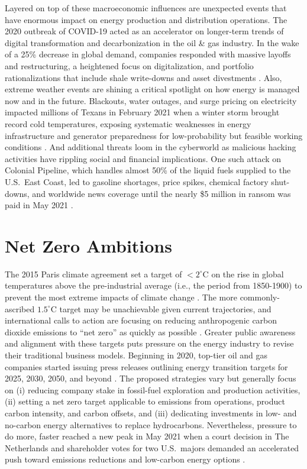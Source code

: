 Layered on top of these macroeconomic influences are unexpected events that have enormous impact on energy production and distribution operations. The 2020 outbreak of COVID-19 acted as an accelerator on longer-term trends of digital transformation and decarbonization in the oil \& gas industry. In the wake of a 25\% decrease in global demand, companies responded with massive layoffs and restructuring, a heightened focus on digitalization, and portfolio rationalizations that include shale write-downs and asset divestments \citep{deloitte_2021_2020}. Also, extreme weather events are shining a critical spotlight on how energy is managed now and in the future. Blackouts, water outages, and surge pricing on electricity impacted millions of Texans in February 2021 when a winter storm brought record cold temperatures, exposing systematic weaknesses in energy infrastructure and generator preparedness for low-probability but feasible working conditions \citep{harc_winter_2021,lazard_lazards_2020}. And additional threats loom in the cyberworld as malicious hacking activities have rippling social and financial implications. One such attack on Colonial Pipeline, which handles almost 50\% of the liquid fuels supplied to the U.S.\ East Coast, led to gasoline shortages, price spikes, chemical factory shut-downs, and worldwide news coverage until the nearly \$5 million in ransom was paid in May 2021 \citep{sanger_pipeline_2021}.

\section{Net Zero Ambitions}\label{ch1:netzero}
The 2015 Paris climate agreement set a target of $<2^\circ$C on the rise in global temperatures above the pre-industrial average (i.e., the period from 1850-1900) to prevent the most extreme impacts of climate change \citep{unfccc_paris_2015}. The more commonly-ascribed $1.5^\circ$C target may be unachievable given current trajectories, and international calls to action are focusing on reducing anthropogenic carbon dioxide emissions to ``net zero'' as quickly as possible \citep{ipcc_global_2018}. Greater public awareness and alignment with these targets puts pressure on the energy industry to revise their traditional business models. Beginning in 2020, top-tier oil and gas companies started issuing press releases outlining energy transition targets for 2025, 2030, 2050, and beyond \citep{bp_international_2020,chevron_chevron_2021,conocophillips_conocophillips_2020,equinor_equinor_2020,exxonmobil_exxonmobil_2021,shell_responsible_2020,shell_shell_2021,total_total_2020,total_2020_2021}. The proposed strategies vary but generally focus on (i) reducing company stake in fossil-fuel exploration and production activities, (ii) setting a net zero target applicable to emissions from operations, product carbon intensity, and carbon offsets, and (iii) dedicating investments in low- and no-carbon energy alternatives to replace hydrocarbons. Nevertheless, pressure to do more, faster reached a new peak in May 2021 when a court decision in The Netherlands and shareholder votes for two U.S.\ majors demanded an accelerated push toward emissions reductions and low-carbon energy options \citep{mcwilliams_investors_2021}.

